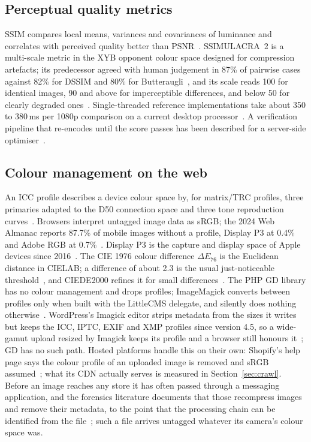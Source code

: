 \documentclass[sigconf,nonacm,screen]{acmart}
\begin{document}
\subsection{Perceptual quality metrics}

SSIM compares local means, variances and covariances of luminance and correlates with perceived quality better than PSNR~\cite{wang2004ssim}. SSIMULACRA~2 is a multi-scale metric in the XYB opponent colour space designed for compression artefacts; its predecessor agreed with human judgement in 87\% of pairwise cases against 82\% for DSSIM and 80\% for Butteraugli~\cite{sneyers2017psychovisual,sneyers2023ssimulacra2}, and its scale reads 100 for identical images, 90 and above for imperceptible differences, and below 50 for clearly degraded ones~\cite{fastssim2}. Single-threaded reference implementations take about 350 to 380\,ms per 1080p comparison on a current desktop processor~\cite{zensim}. A verification pipeline that re-encodes until the score passes has been described for a server-side optimiser~\cite{modpagespeed}.

\subsection{Colour management on the web}

An ICC profile describes a device colour space by, for matrix/TRC profiles, three primaries adapted to the D50 connection space and three tone reproduction curves~\cite{icc2010}. Browsers interpret untagged image data as sRGB; the 2024 Web Almanac reports 87.7\% of mobile images without a profile, Display P3 at 0.4\% and Adobe RGB at 0.7\%~\cite{almanac2024media}. Display P3 is the capture and display space of Apple devices since 2016~\cite{iccdisplayp3}. The CIE 1976 colour difference $\Delta E_{76}$ is the Euclidean distance in CIELAB; a difference of about 2.3 is the usual just-noticeable threshold~\cite{mokrzycki2011}, and CIEDE2000 refines it for small differences~\cite{sharma2005ciede}. The PHP GD library has no colour management and drops profiles; ImageMagick converts between profiles only when built with the LittleCMS delegate, and silently does nothing otherwise~\cite{phpimagick}. WordPress's Imagick editor strips metadata from the sizes it writes but keeps the ICC, IPTC, EXIF and XMP profiles since version 4.5, so a wide-gamut upload resized by Imagick keeps its profile and a browser still honours it~\cite{wptrac33642,wptrac58435}; GD has no such path. Hosted platforms handle this on their own: Shopify's help page says the colour profile of an uploaded image is removed and sRGB assumed~\cite{shopifycolors}; what its CDN actually serves is measured in Section~\ref{sec:crawl}. Before an image reaches any store it has often passed through a messaging application, and the forensics literature documents that those recompress images and remove their metadata, to the point that the processing chain can be identified from the file~\cite{giudice2017ballistics,pasquini2021survey}; such a file arrives untagged whatever its camera's colour space was.
\end{document}
